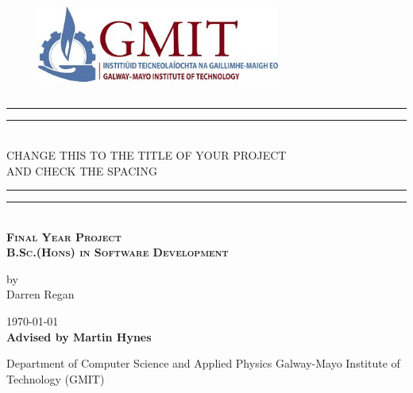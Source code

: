 \documentclass{book}
\newcommand*{\customTitle}{\begingroup %
\centering %
\vspace*{\baselineskip} %

\rule{\textwidth}{1.6pt}\vspace*{-\baselineskip}\vspace*{2pt} %
\rule{\textwidth}{0.4pt}\\[\baselineskip] %

{\Large CHANGE THIS TO THE TITLE OF YOUR PROJECT \\[2ex] AND CHECK THE SPACING}\\[0.2\baselineskip] %


\rule{\textwidth}{0.4pt}\vspace*{-\baselineskip}\vspace{3.2pt} %
\rule{\textwidth}{1.6pt}\\[\baselineskip] %
\scshape %
\Large \textbf{Final Year Project}\\
\textbf{B.Sc.(Hons) in Software Development}\par %
\normalsize
\vspace*{2\baselineskip} %


{by \\ Darren Regan  \par} %


\vspace*{2\baselineskip} %
\vfill %
{\scshape \today} \\[0.3\baselineskip] %



{\textbf{Advised by Martin Hynes}}\par %

{Department of Computer Science and Applied Physics Galway-Mayo Institute of Technology (GMIT)}\par %


\endgroup}
\begin{document}
 
\begin{figure}
\begin{center}
\includegraphics[width=8cm,height=3.3cm,keepaspectratio]{Images/gmit-logo.jpg} %
\end{center}
\end{figure}
\customTitle %
\tableofcontents
\listoffigures
{} 













\end{document}

